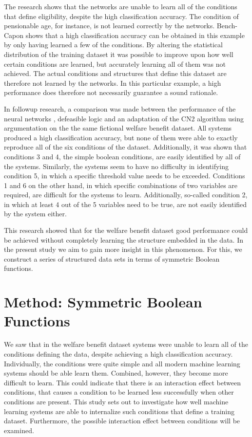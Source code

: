 \documentclass[letterpaper]{article} %
\begin{document}
The research shows that the networks are unable to learn all of the conditions that define eligibility, despite the high classification accuracy. The condition of pensionable age, for instance, is not learned correctly by the networks. Bench-Capon shows that a high classification accuracy can be obtained in this example by only having learned a few of the conditions. By altering the statistical distribution of the training dataset it was possible to improve upon how well certain conditions are learned, but accurately learning all of them was not achieved. The actual conditions and structures that define this dataset are therefore not learned by the networks. In this particular example, a high performance does therefore not necessarily guarantee a sound rationale.

In followup research, a comparison was made between the performance of the neural networks \cite{bench1993neural},  defeasible logic \cite{johnston2003induction} and an adaptation of the CN2 algorithm using argumentation \cite{movzina2005argument} on the the same fictional welfare benefit dataset. All systems produced a high classification accuracy, but none of them were able to exactly reproduce all of the six conditions of the dataset. Additionally, it was shown that conditions 3 and 4, the simple boolean conditions, are easily identified by all of the systems. Similarly, the systems seem to have no difficulty in identifying condition 5, in which a specific threshold value needs to be exceeded. Conditions 1 and 6 on the other hand, in which specific combinations of two variables are required, are difficult for the systems to learn.  Additionally, so-called condition 2, in which at least 4 out of the 5 variables need to be true, are not easily identified by the system either. 

This research showed that for the welfare benefit dataset good performance could be achieved without completely learning the structure embedded in the data. In the present study we aim to gain more insight in this phenomenon. For this, we construct a series of structured data sets in terms of symmetric Boolean functions.

\section{Method: Symmetric Boolean Functions}
We saw that in the welfare benefit dataset systems were unable to learn all of the conditions defining the data, despite achieving a high classification accuracy. Individually, the conditions were quite simple and all modern machine learning systems should be able learn them. Combined, however, they become more difficult to learn. This could indicate that there is an interaction effect between conditions, that causes a condition to be learned less successfully when other conditions are present. 
This study sets out to investigate how well machine learning systems are able to internalize such conditions that define a training dataset. Furthermore, the possible interaction effect between conditions will be examined.
\end{document}
